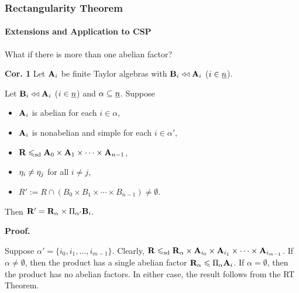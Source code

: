 \documentclass[9pt,xcolor=dvipsnames%
   ]{beamer}
\begin{document}
\begin{frame} \frametitle{Rectangularity Theorem}
  \framesubtitle{Extensions and Application to CSP}
  What if there is more than one abelian factor? 

  \bigskip
  {\bf Cor. 1} Let $\mathbf{A}_i$ be finite Taylor algebras with
  $\mathbf{B}_i \mathrel{\triangleleft\triangleleft} \mathbf{A}_i$ ($i\in \underline{n}$).
  
  Let $\mathbf{B}_i \mathrel{\triangleleft\triangleleft} \mathbf{A}_i$ ($i\in \underline{n}$) and $\alpha \subseteq \underline{n}$.  Suppose
  \begin{itemize}
  \item $\mathbf{A}_i$ is abelian for each $i \in \alpha$,
  \item $\mathbf{A}_i$ is nonabelian and simple for each $i \in \alpha'$,
  \item $\mathbf{R} \leqslant_{\mathrm{sd}} \mathbf{A}_0 \times \mathbf{A}_1 \times \cdots \times \mathbf{A}_{n-1}$,
  \item $\eta_i \neq \eta_j$ for all $i\neq j$, %
  \item $R':= R \cap (B_0 \times B_1 \times \cdots \times B_{n-1}) \neq \emptyset$.
  \end{itemize}
  Then $\mathbf{R}'= \mathbf{R}_\alpha  \times \Pi_{\alpha'}\mathbf{B}_i$.

  \bigskip
  {\bf Proof.}
  
    Suppose $\alpha' = \{i_0, i_1, \dots, i_{m-1}\}$.
    Clearly, 
    $\mathbf{R} \leqslant_{\mathrm{sd}} \mathbf{R}_\alpha \times \mathbf{A}_{i_0} \times \mathbf{A}_{i_1} \times \cdots \times \mathbf{A}_{i_{m-1}}$. 
    If $\alpha\neq \emptyset$, then the product 
    has a single abelian factor
    $\mathbf{R}_\alpha \leqslant \Pi_{\alpha} \mathbf{A}_i$.
    If $\alpha= \emptyset$, then the product has no abelian factors.
    In either case, the result follows from the RT Theorem.

\end{frame}
\end{document}
